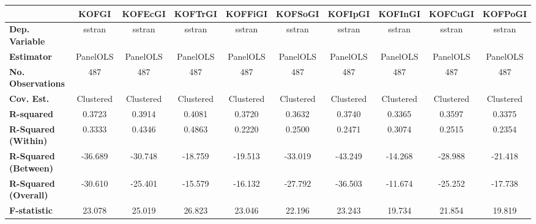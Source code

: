 \begin{center}
\begin{tabular}{lccccccccc}
\toprule
                                   & \textbf{KOFGI} & \textbf{KOFEcGI} & \textbf{KOFTrGI} & \textbf{KOFFiGI} & \textbf{KOFSoGI} & \textbf{KOFIpGI} & \textbf{KOFInGI} & \textbf{KOFCuGI} & \textbf{KOFPoGI}  \\
\midrule
\textbf{Dep. Variable}             &     sstran     &      sstran      &      sstran      &      sstran      &      sstran      &      sstran      &      sstran      &      sstran      &      sstran       \\
\textbf{Estimator}                 &    PanelOLS    &     PanelOLS     &     PanelOLS     &     PanelOLS     &     PanelOLS     &     PanelOLS     &     PanelOLS     &     PanelOLS     &     PanelOLS      \\
\textbf{No. Observations}          &      487       &       487        &       487        &       487        &       487        &       487        &       487        &       487        &       487         \\
\textbf{Cov. Est.}                 &   Clustered    &    Clustered     &    Clustered     &    Clustered     &    Clustered     &    Clustered     &    Clustered     &    Clustered     &    Clustered      \\
\textbf{R-squared}                 &     0.3723     &      0.3914      &      0.4081      &      0.3720      &      0.3632      &      0.3740      &      0.3365      &      0.3597      &      0.3375       \\
\textbf{R-Squared (Within)}        &     0.3333     &      0.4346      &      0.4863      &      0.2220      &      0.2500      &      0.2471      &      0.3074      &      0.2515      &      0.2354       \\
\textbf{R-Squared (Between)}       &    -36.689     &     -30.748      &     -18.759      &     -19.513      &     -33.019      &     -43.249      &     -14.268      &     -28.988      &     -21.418       \\
\textbf{R-Squared (Overall)}       &    -30.610     &     -25.401      &     -15.579      &     -16.132      &     -27.792      &     -36.503      &     -11.674      &     -25.252      &     -17.738       \\
\textbf{F-statistic}               &     23.078     &      25.019      &      26.823      &      23.046      &      22.196      &      23.243      &      19.734      &      21.854      &      19.819       \\

\end{tabular}
\end{center}
